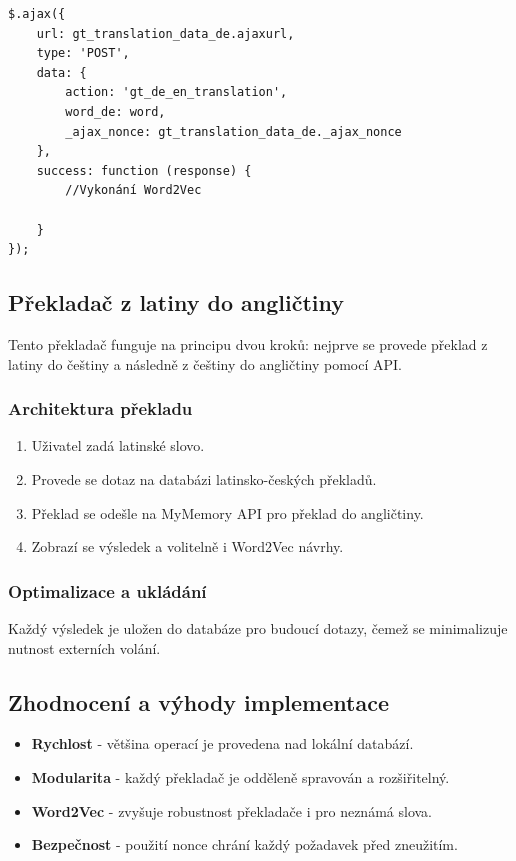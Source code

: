 \documentclass[czech, ba, kiv, he]{fasthesis}
\begin{document}
\begin{lstlisting}[caption={POST požadavek}]
$.ajax({
    url: gt_translation_data_de.ajaxurl,
    type: 'POST',
    data: {
        action: 'gt_de_en_translation',
        word_de: word,
        _ajax_nonce: gt_translation_data_de._ajax_nonce
    },
    success: function (response) {
    	//Vykonání Word2Vec
       
    }
});
\end{lstlisting}

\subsection{Překladač z latiny do angličtiny}

Tento překladač funguje na principu dvou kroků: nejprve se provede překlad z latiny do češtiny a následně z češtiny do angličtiny pomocí API.

\subsubsection*{Architektura překladu}

\begin{enumerate}
    \item Uživatel zadá latinské slovo.
    \item Provede se dotaz na databázi latinsko-českých překladů.
    \item Překlad se odešle na MyMemory API pro překlad do angličtiny.
    \item Zobrazí se výsledek a volitelně i Word2Vec návrhy.
\end{enumerate}

\subsubsection*{Optimalizace a ukládání}
Každý výsledek je uložen do databáze pro budoucí dotazy, čemež se minimalizuje nutnost externích volání.

\subsection{Zhodnocení a výhody implementace}

\begin{itemize}
    \item \textbf{Rychlost} - většina operací je provedena nad lokální databází.
    \item \textbf{Modularita} - každý překladač je odděleně spravován a rozšiřitelný.
    \item \textbf{Word2Vec} - zvyšuje robustnost překladače i pro neznámá slova.
    \item \textbf{Bezpečnost} - použití nonce chrání každý požadavek před zneužitím.
\end{itemize}
\end{document}
